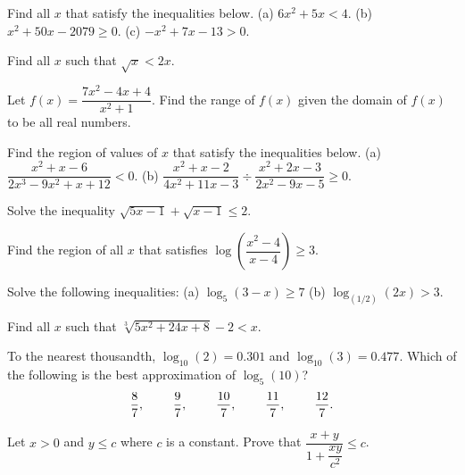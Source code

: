 \documentclass[lang=en,11pt]{elegantbook}
\begin{document}
\begin{reviewset}
\item Find all $x$ that satisfy the inequalities below. \newline
(a) $6x^2+5x<4$.  (b) $x^2+50x-2079\geq 0$.  (c) $-x^2+7x-13>0$. \vspace{3mm}
\item Find all $x$ such that $\sqrt{x}<2x$. \vspace{3mm}
\item Let $f(x)=\dfrac{7x^2-4x+4}{x^2+1}$. Find the range of $f(x)$ given the domain of $f(x)$ to be all real numbers. \vspace{3mm}
\item Find the region of values of $x$ that satisfy the inequalities below. \newline 
(a) $\dfrac{x^2+x-6}{2x^3-9x^2+x+12}<0$.  (b) $\dfrac{x^2+x-2}{4x^2+11x-3}\div\dfrac{x^2+2x-3}{2x^2-9x-5}\geq 0.$ \vspace{3mm}
\item Solve the inequality $\sqrt{5x-1}+\sqrt{x-1}\leq 2$. \vspace{3mm}
\item Find the region of all $x$ that satisfies $\log\left(\dfrac{x^2-4}{x-4}\right)\geq 3$. \vspace{2mm}
\item Solve the following inequalities: \newline 
(a) $\log_5(3-x)\geq 7$ \hspace{50mm} (b) $\log_{(1/2)}(2x)>3$. \vspace{3mm}
\item Find all $x$ such that $\sqrt[3]{5x^2+24x+8}-2<x$. \vspace{3mm}
\item To the nearest thousandth, $\log_{10}(2)=0.301$ and $\log_{10}(3)=0.477$. Which of the following is the best approximation of $\log_5(10)$? \newline 
$$\dfrac{8}{7},\hspace{8mm}\dfrac{9}{7},\hspace{8mm}\dfrac{10}{7},\hspace{8mm}\dfrac{11}{7},\hspace{8mm}\dfrac{12}{7}.$$ \vspace{3mm}
\item Let $x>0$ and $y\leq c$ where $c$ is a constant.  Prove that $\dfrac{x+y}{1+\dfrac{xy}{c^2}}\leq c$. \vspace{3mm}

\end{reviewset}
\end{document}

